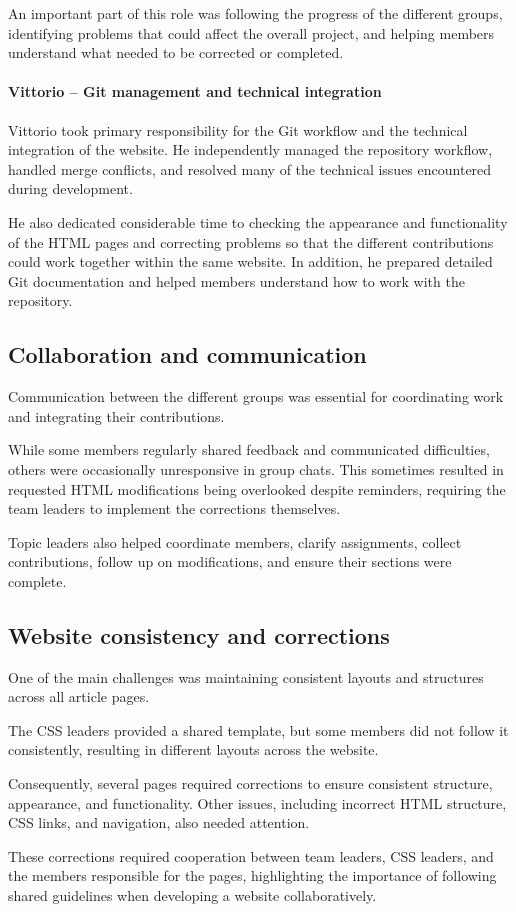 An important part of this role was following the progress of the different groups, identifying problems that could affect the overall project, and helping members understand what needed to be corrected or completed.

\paragraph{Vittorio -- Git management and technical integration}

Vittorio took primary responsibility for the Git workflow and the technical integration of the website. He independently managed the repository workflow, handled merge conflicts, and resolved many of the technical issues encountered
during development.

He also dedicated considerable time to checking the appearance and functionality of the HTML pages and correcting problems so that the different contributions could work together within the same website. In addition, he prepared detailed Git documentation and helped members understand how to work with the repository.

\subsection{Collaboration and communication}
\label{sec:collaboration}

Communication between the different groups was essential for coordinating work and integrating their contributions.

While some members regularly shared feedback and communicated difficulties, others were occasionally unresponsive in group chats. This sometimes resulted in requested HTML modifications being overlooked despite reminders, requiring the team leaders to implement the corrections themselves.

Topic leaders also helped coordinate members, clarify assignments, collect contributions, follow up on modifications, and ensure their sections were complete.

\subsection{Website consistency and corrections}
\label{sec:corrections}

One of the main challenges was maintaining consistent layouts and structures across all article pages.

The CSS leaders provided a shared template, but some members did not follow it consistently,
resulting in different layouts across the website.

Consequently, several pages required corrections to ensure consistent structure, appearance, and functionality.
Other issues, including incorrect HTML structure, CSS links, and navigation, also needed attention.

These corrections required cooperation between team leaders, CSS leaders, and the members responsible for the pages,
highlighting the importance of following shared guidelines when developing a website collaboratively.
